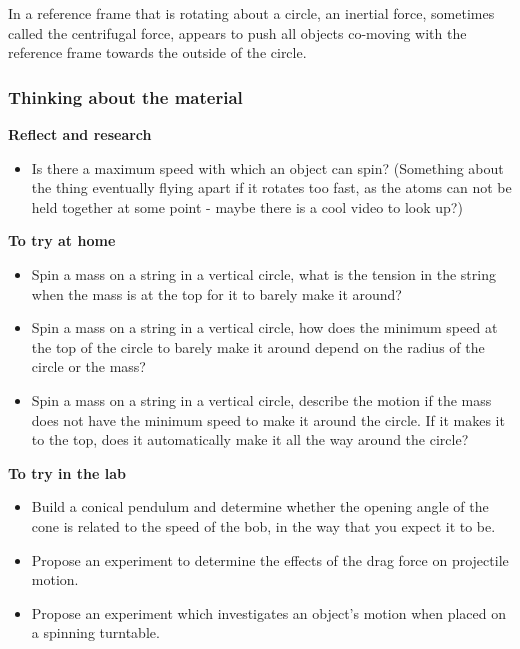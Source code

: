 In a reference frame that is rotating about a circle, an inertial force, sometimes called the centrifugal force, appears to push all objects co-moving with the reference frame towards the outside of the circle.

\subsubsection{Thinking about the material}

\begin{framed}
\textbf{Reflect and research}\\
\begin{itemize}
\item Is there a maximum speed with which an object can spin? (Something about the thing eventually flying apart if it rotates too fast, as the atoms can not be held together at some point - maybe there is a cool video to look up?)
\end{itemize}
\end{framed}

\begin{framed}
\textbf{To try at home}\\
\begin{itemize}
\item Spin a mass on a string in a vertical circle, what is the tension in the string when the mass is at the top for it to barely make it around?
\item Spin a mass on a string in a vertical circle, how does the minimum speed at the top of the circle to barely make it around  depend on the radius of the circle or the mass?
\item Spin a mass on a string in a vertical circle, describe the motion if the mass does not have the minimum speed to make it around the circle. If it makes it to the top, does it automatically make it all the way around the circle?
\end{itemize}
\end{framed}

\begin{framed}
\textbf{To try in the lab}\\
\begin{itemize}
\item Build a conical pendulum and determine whether the opening angle of the cone is related to the speed of the bob, in the way that you expect it to be.
\item Propose an experiment to determine the effects of the drag force on projectile motion.
\item Propose an experiment which investigates an object's motion when placed on a spinning turntable.
\end{itemize}
\end{framed}

